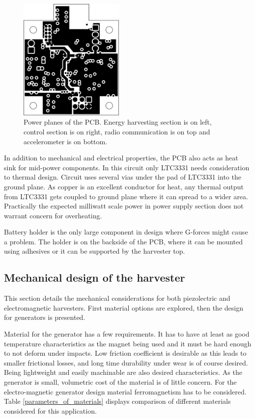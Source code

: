 \begin{figure}[htb]
  \begin{center}
    \includegraphics[height=6cm]{images/own_dwg/circuit/powerplane.jpg}
  \end{center}
  \caption{\label{fig:pcb_planes} Power planes of the PCB. Energy harvesting section is on left, control section is on right, radio communication is on top and accelerometer is on bottom.}
\end{figure}

In addition to mechanical and electrical properties, the PCB also acts as heat sink for mid-power components. In this circuit only LTC3331 needs consideration to thermal design. Circuit uses several vias under the pad of LTC3331 into the ground plane. As copper is an excellent conductor for heat, any thermal output from LTC3331 gets coupled to ground plane where it can spread to a wider area. Practically the expected milliwatt scale power in power supply section does not warrant concern for overheating.

Battery holder is the only large component in design where G-forces might cause a problem. The holder is on the backside of the PCB, where it can be mounted using adhesives or it can be supported by the harvester top.

\subsection{Mechanical design of the harvester}
This section details the mechanical considerations for both piezolectric and electromagnetic harvesters. First material options are explored, then the design for generators is presented.

Material for the generator has a few requirements. It has to have at least as good temperature characteristics as the magnet being used and it must be hard enough to not deform under impacts. Low friction coefficient is desirable as this leads to smaller  frictional losses, and long time durability under wear is of course desired. Being lightweight and easily machinable are also desired characteristics. As the generator is small, volumetric cost of the material is of little concern. For the electro-magnetic generator design material ferromagnetism has to be considered. Table \ref{parameters_of_materials} displays comparison of different materials considered for this application.

